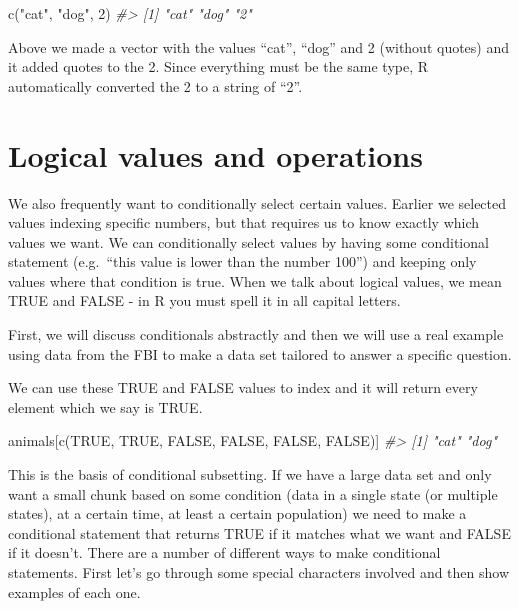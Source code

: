 \documentclass[
  12pt,
]{book}
\newenvironment{Shaded}{\begin{snugshade}}{\end{snugshade}}
\newcommand{\CommentTok}[1]{\textcolor[rgb]{0.37,0.37,0.37}{\textit{#1}}}
\newcommand{\ConstantTok}[1]{\textcolor[rgb]{0,0,0}{#1}}
\newcommand{\DecValTok}[1]{\textcolor[rgb]{0.06,0.06,0.06}{#1}}
\newcommand{\FunctionTok}[1]{\textcolor[rgb]{0,0,0}{#1}}
\newcommand{\NormalTok}[1]{#1}
\newcommand{\StringTok}[1]{\textcolor[rgb]{0.5,0.5,0.5}{#1}}
\begin{document}
\begin{Shaded}
\begin{Highlighting}[]
\FunctionTok{c}\NormalTok{(}\StringTok{"cat"}\NormalTok{, }\StringTok{"dog"}\NormalTok{, }\DecValTok{2}\NormalTok{)}
\CommentTok{\#\textgreater{} [1] "cat" "dog" "2"}
\end{Highlighting}
\end{Shaded}

Above we made a vector with the values ``cat'', ``dog'' and 2 (without quotes) and it added quotes to the 2. Since everything must be the same type, R automatically converted the 2 to a string of ``2''.

\hypertarget{logical-values-and-operations}{%
\section{Logical values and operations}\label{logical-values-and-operations}}

We also frequently want to conditionally select certain values. Earlier we selected values indexing specific numbers, but that requires us to know exactly which values we want. We can conditionally select values by having some conditional statement (e.g.~``this value is lower than the number 100'') and keeping only values where that condition is true. When we talk about logical values, we mean TRUE and FALSE - in R you must spell it in all capital letters.

First, we will discuss conditionals abstractly and then we will use a real example using data from the FBI to make a data set tailored to answer a specific question.

We can use these TRUE and FALSE values to index and it will return every element which we say is TRUE.

\begin{Shaded}
\begin{Highlighting}[]
\NormalTok{animals[}\FunctionTok{c}\NormalTok{(}\ConstantTok{TRUE}\NormalTok{, }\ConstantTok{TRUE}\NormalTok{, }\ConstantTok{FALSE}\NormalTok{, }\ConstantTok{FALSE}\NormalTok{, }\ConstantTok{FALSE}\NormalTok{, }\ConstantTok{FALSE}\NormalTok{)]}
\CommentTok{\#\textgreater{} [1] "cat" "dog"}
\end{Highlighting}
\end{Shaded}

This is the basis of conditional subsetting. If we have a large data set and only want a small chunk based on some condition (data in a single state (or multiple states), at a certain time, at least a certain population) we need to make a conditional statement that returns TRUE if it matches what we want and FALSE if it doesn't. There are a number of different ways to make conditional statements. First let's go through some special characters involved and then show examples of each one.
\end{document}
